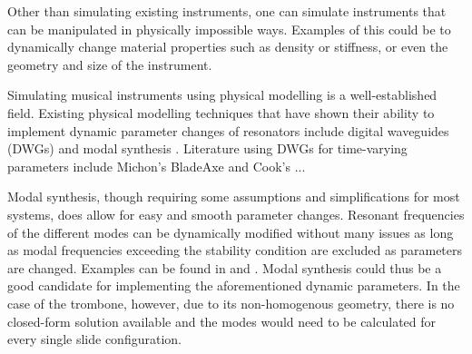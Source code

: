 
Other than simulating existing instruments, one can simulate instruments that can be manipulated in physically impossible ways. %
Examples of this could be to dynamically change material properties such as density or stiffness, or even the geometry and size of the instrument. %


Simulating musical instruments using physical modelling is a well-established field. Existing physical modelling techniques that have shown their ability to implement dynamic parameter changes of resonators include digital waveguides (DWGs) \cite{Smith1992} and modal synthesis \cite{morrison1993mosaic}. Literature using DWGs for time-varying parameters include Michon's BladeAxe \cite{Michon2014,Michon2016} and Cook's ... 

Modal synthesis, though requiring some assumptions and simplifications for most systems, does allow for easy and smooth parameter changes. Resonant frequencies of the different modes can be dynamically modified without many issues as long as modal frequencies exceeding the stability condition are excluded as parameters are changed. Examples can be found in \cite{Willemsen2017} and \cite{Mehes2016, Mehes2017, Walstijn2017} . Modal synthesis could thus be a good candidate for implementing the aforementioned dynamic parameters. In the case of the trombone, however, due to its non-homogenous geometry, there is no closed-form solution available and the modes would need to be calculated for every single slide configuration.

